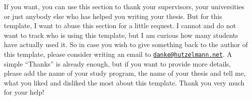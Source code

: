 \documentclass[\myrootdir/main.tex]{subfiles}
\begin{document}
\thispagestyle{empty}

\vspace*{2cm}

\begin{center}
{ \myAcknowTitle}
\end{center}

\vspace{1cm}
\noindent
If you want, you can use this section to thank your supervisors, your universities or just anybody else who has helped you writing your thesis.
But for this template, I want to abuse this section for a little request.
I cannot and do not want to track who is using this template, but I am curious how many students have actually used it.
So in case you wish to give something back to the author of this template, please consider writing an email to \href{mailto:danke@hutzelmann.net}{\nolinkurl{danke@hutzelmann.net}}.
A simple \enquote{Thanks} is already enough, but if you want to provide more details, please add the name of your study program, the name of your thesis and tell me, what you liked and disliked the most about this template.
Thank you very much for your help!
\end{document}
